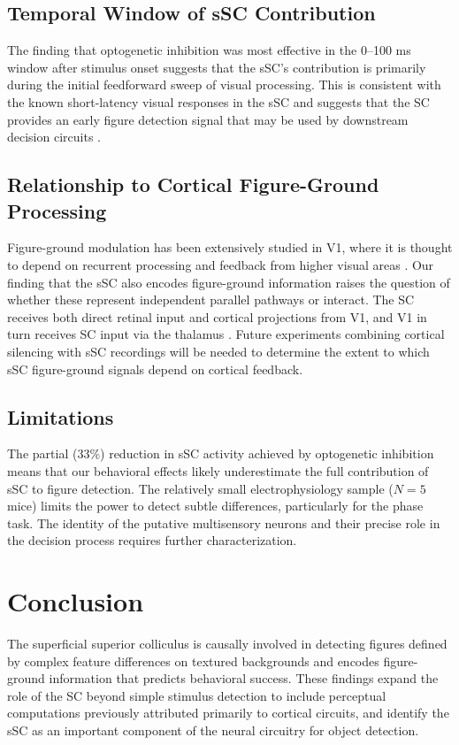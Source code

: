 \documentclass[12pt]{article}
\begin{document}
\subsection{Temporal Window of sSC Contribution}

The finding that optogenetic inhibition was most effective in the 0--100 ms window after stimulus onset suggests that the sSC's contribution is primarily during the initial feedforward sweep of visual processing. This is consistent with the known short-latency visual responses in the sSC and suggests that the SC provides an early figure detection signal that may be used by downstream decision circuits \citep{zhao2014sc, wang2010sc}.

\subsection{Relationship to Cortical Figure-Ground Processing}

Figure-ground modulation has been extensively studied in V1, where it is thought to depend on recurrent processing and feedback from higher visual areas \citep{lamme1995figure}. Our finding that the sSC also encodes figure-ground information raises the question of whether these represent independent parallel pathways or interact. The SC receives both direct retinal input and cortical projections from V1, and V1 in turn receives SC input via the thalamus \citep{zingg2017sc}. Future experiments combining cortical silencing with sSC recordings will be needed to determine the extent to which sSC figure-ground signals depend on cortical feedback.

\subsection{Limitations}

The partial (33\%) reduction in sSC activity achieved by optogenetic inhibition means that our behavioral effects likely underestimate the full contribution of sSC to figure detection. The relatively small electrophysiology sample ($N = 5$ mice) limits the power to detect subtle differences, particularly for the phase task. The identity of the putative multisensory neurons and their precise role in the decision process requires further characterization.

\section{Conclusion}

The superficial superior colliculus is causally involved in detecting figures defined by complex feature differences on textured backgrounds and encodes figure-ground information that predicts behavioral success. These findings expand the role of the SC beyond simple stimulus detection to include perceptual computations previously attributed primarily to cortical circuits, and identify the sSC as an important component of the neural circuitry for object detection.



\end{document}
